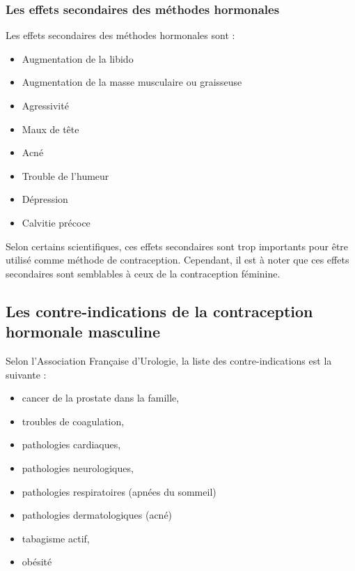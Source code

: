 \documentclass[12pt,a4paper]{report}
\begin{document}
\subsubsection{Les effets secondaires des méthodes hormonales} \label{effets-secondaires-methodes-hormonales}

Les effets secondaires des méthodes hormonales sont :
\begin{itemize}
    \item Augmentation de la libido
    \item Augmentation de la masse musculaire ou graisseuse
    \item Agressivité
    \item Maux de tête
    \item Acné
    \item Trouble de l'humeur
    \item Dépression
    \item Calvitie précoce \cite{guillaumedaudinContraceptesEnqueteDernier2022}\cite{anne-sophiedelcourHommeSousPilule}\cite{ContraceptionHormonaleMasculine2016}
\end{itemize}

Selon certains scientifiques, ces effets secondaires sont trop importants pour être utilisé comme méthode de contraception. Cependant, il est à noter que ces effets secondaires sont semblables à ceux de la contraception féminine. \cite{ContraceptionHormonaleMasculine2016}

\subsection{Les contre-indications de la contraception hormonale masculine}

Selon l'Association Française d'Urologie, la liste des contre-indications est la suivante :

\begin{itemize}
    \item cancer de la prostate dans la famille,
    \item troubles de coagulation,
    \item pathologies cardiaques,
    \item pathologies neurologiques,
    \item pathologies respiratoires (apnées du sommeil)
    \item pathologies dermatologiques (acné)
    \item tabagisme actif,
    \item obésité   \cite{tcherdukianContraceptionMasculineQuelles2020}
\end{itemize}
\end{document}
